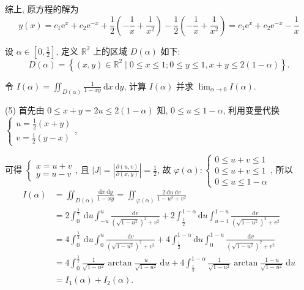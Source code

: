 \begin{solution}
    综上, 原方程的解为
    $$
        y(x)=c_1 \mathrm{e}^x+c_2 \mathrm{e}^{-x}+\frac{1}{2}\left(-\frac{1}{x}+\frac{1}{x^2}\right)-\frac{1}{2}\left(-\frac{1}{x}+\frac{1}{x^2}\right)=c_1 \mathrm{e}^x+c_2 \mathrm{e}^{-x}-\frac{1}{x}
    $$
\end{solution}



\begin{solution}
    设 $\alpha \in\left[0, \frac{1}{2}\right]$, 定义 $\mathbb{R}^2$ 上的区域 $D(\alpha)$ 如下:
    $$
        D(\alpha)=\left\{(x, y) \in \mathbb{R}^2 \mid 0 \leqslant x \leqslant 1 ; 0 \leqslant y \leqslant 1, x+y \leqslant 2(1-\alpha)\right\} .
    $$

    令 $I(\alpha)=\iint_{D(\alpha)} \frac{1}{1-x y} \mathrm{~d} x \mathrm{~d} y$, 计算 $I(\alpha)$ 并求 $\lim _{\alpha \rightarrow 0} I(\alpha)$.
 
    (5) 首先由 $0 \leqslant x+y=2 u \leqslant 2(1-\alpha)$ 知, $0 \leqslant u \leqslant 1-\alpha$, 利用变量代换 $\left\{\begin{array}{l}u=\frac{1}{2}(x+y) \\ v=\frac{1}{2}(y-x)\end{array}\right.$,

    可得 $\left\{\begin{array}{l}x=u+v \\ y=u-v\end{array}\right.$, 且 $|J|=\left|\frac{\partial(u, v)}{\partial(x, y)}\right|=\frac{1}{2}$, 故 $\varphi(\alpha):\left\{\begin{array}{l}0 \leq u+v \leq 1 \\ 0 \leq u+v \leq 1 \\ 0 \leq u \leq 1-\alpha\end{array}\right.$, 所以
    $$
        \begin{aligned}
            I(\alpha) & =\iint_{D(\alpha)} \frac{\mathrm{d} x \mathrm{~d} y}{1-x y}=\iint_{\varphi(\alpha)} \frac{2 \mathrm{~d} u \mathrm{~d} v}{1-u^2+v^2}                                                                                       \\
                      & =2 \int_0^{\frac{1}{2}} \mathrm{~d} u \int_{-u}^u \frac{\mathrm{d} v}{\left(\sqrt{1-u^2}\right)^2+v^2}+2 \int_{\frac{1}{2}}^{1-\alpha} \mathrm{d} u \int_{u-1}^{1-u} \frac{\mathrm{d} v}{\left(\sqrt{1-u^2}\right)^2+v^2} \\
                      & =4 \int_0^{\frac{1}{2}} \mathrm{~d} u \int_0^u \frac{\mathrm{d} v}{\left(\sqrt{1-u^2}\right)^2+v^2}+4 \int_{\frac{1}{2}}^{1-\alpha} \mathrm{d} u \int_0^{1-u} \frac{\mathrm{d} v}{\left(\sqrt{1-u^2}\right)^2+v^2}        \\
                      & =4 \int_0^{\frac{1}{2}} \frac{1}{\sqrt{1-u^2}} \arctan \frac{u}{\sqrt{1-u^2}} \mathrm{~d} u+4 \int_{\frac{1}{2}}^{1-\alpha} \frac{1}{\sqrt{1-u^2}} \arctan \frac{1-u}{\sqrt{1-u^2}} \mathrm{~d} u                         \\
                      & =I_1(\alpha)+I_2(\alpha) .
        \end{aligned}
    $$


\end{solution}
